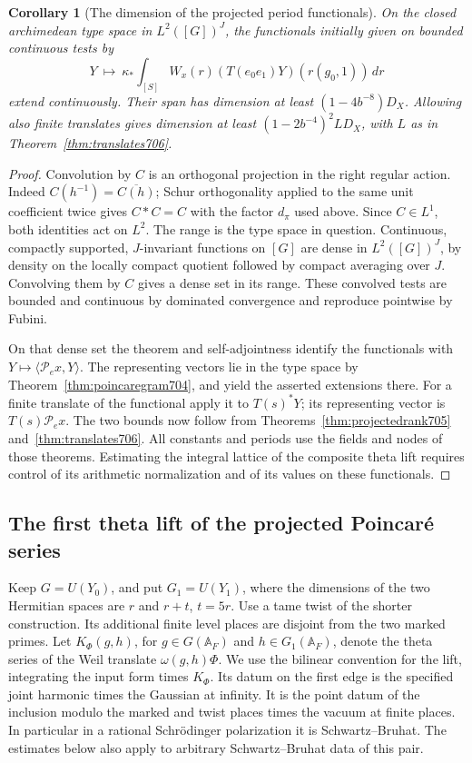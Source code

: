 \documentclass[a4paper,11pt]{article}
\newtheorem{corollary}[proposition]{Corollary}
\theoremstyle{definition}
\theoremstyle{remark}
\numberwithin{equation}{section}
\begin{document}
\begin{corollary}[The dimension of the projected period functionals]\leavevmode
\label{cor:periodrank707}
On the closed archimedean type space in \(L^2([G])^J\),
the functionals initially given on bounded continuous tests by
\[
 Y\ \longmapsto\ \kappa_*\int_{[S]} W_x(r)
                         (T(e_0e_1)Y)(r(g_0,1))\,dr
\]
extend continuously. Their span has dimension at least
\((1-4b^{-8})D_X\). Allowing also finite translates gives
dimension at least \((1-2b^{-4})^2 L D_X\), with
\(L\) as in Theorem~\ref{thm:translates706}.
\end{corollary}
\begin{proof}
Convolution by \(C\) is an orthogonal projection in the
right regular action. Indeed \(C(h^{-1})=\overline{C(h)}\);
Schur orthogonality applied to the same unit coefficient
twice gives \(C*C=C\) with the factor \(d_\pi\) used above.
Since \(C\in L^1\), both identities act on \(L^2\).
The range is the type space in question. Continuous,
compactly supported, \(J\)-invariant functions on \([G]\)
are dense in \(L^2([G])^J\), by density on the locally
compact quotient followed by compact averaging over \(J\).
Convolving them by \(C\) gives a dense set in its range.
These convolved tests are bounded and continuous by
dominated convergence and reproduce pointwise by Fubini.

On that dense set the theorem and self-adjointness identify
the functionals with \(Y\mapsto\langle\mathcal P_e x,Y\rangle\).
The representing vectors lie in the type space by
Theorem~\ref{thm:poincaregram704}, and yield the asserted
extensions there. For a finite translate of the functional
apply it to \(T(s)^*Y\); its representing vector is
\(T(s)\mathcal P_e x\). The two bounds now follow from
Theorems~\ref{thm:projectedrank705} and~\ref{thm:translates706}.
All constants and periods use the fields and nodes of those
theorems. Estimating the integral lattice of the composite
theta lift requires control of its arithmetic normalization
and of its values on these functionals.
\end{proof}


\subsection{The first theta lift of the projected Poincar\'e series}
\label{sec:firstlift708}

Keep \(G=U(Y_0)\), and put \(G_1=U(Y_1)\), where the dimensions
of the two Hermitian spaces are \(r\) and \(r+t\), \(t=5r\).
Use a tame twist of the shorter construction. Its additional
finite level places are disjoint from the two marked primes.
Let \(K_\Phi(g,h)\), for \(g\in G(\mathbb A_F)\) and
\(h\in G_1(\mathbb A_F)\), denote the theta series of the Weil
translate \(\omega(g,h)\Phi\). We use the bilinear convention
for the lift, integrating the input form times \(K_\Phi\).
Its datum on the first edge is the specified joint harmonic
times the Gaussian at infinity. It is the point datum of the
inclusion modulo the marked and twist places times the vacuum
at finite places. In particular in a rational Schr\"odinger
polarization it is Schwartz--Bruhat. The estimates below
also apply to arbitrary Schwartz--Bruhat data of this pair.
\end{document}
